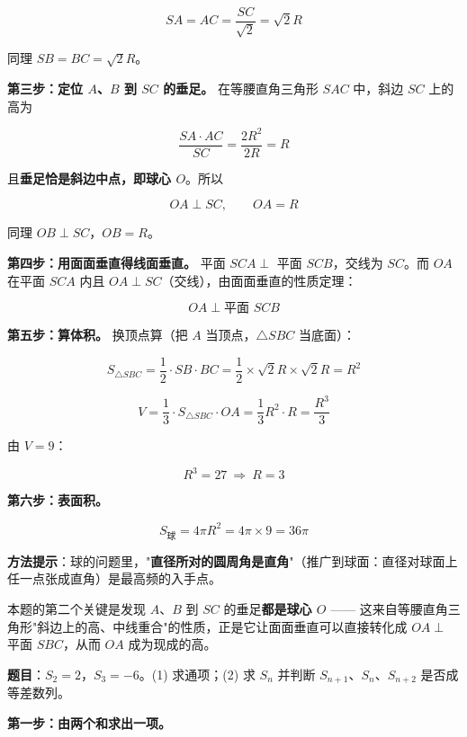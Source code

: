 \[SA=AC=\frac{SC}{\sqrt2}=\sqrt2R\]

同理 $SB=BC=\sqrt2R$。

\textbf{第三步：定位 $A$、$B$ 到 $SC$ 的垂足。} 在等腰直角三角形 $SAC$ 中，斜边 $SC$ 上的高为

\[\frac{SA\cdot AC}{SC}=\frac{2R^{2}}{2R}=R\]

且\textbf{垂足恰是斜边中点，即球心 $O$}。所以

\[OA\perp SC,\qquad OA=R\]

同理 $OB\perp SC$，$OB=R$。

\textbf{第四步：用面面垂直得线面垂直。} 平面 $SCA\perp$ 平面 $SCB$，交线为 $SC$。而 $OA$ 在平面 $SCA$ 内且 $OA\perp SC$（交线），由面面垂直的性质定理：

\[OA\perp\text{平面 }SCB\]

\textbf{第五步：算体积。} 换顶点算（把 $A$ 当顶点，$\triangle SBC$ 当底面）：

\[S_{\triangle SBC}=\frac12\cdot SB\cdot BC=\frac12\times\sqrt2R\times\sqrt2R=R^{2}\]

\[V=\frac13\cdot S_{\triangle SBC}\cdot OA=\frac13R^{2}\cdot R=\frac{R^{3}}3\]

由 $V=9$：

\[R^{3}=27\ \Longrightarrow\ R=3\]

\textbf{第六步：表面积。}

\[S_{\text{球}}=4\pi R^{2}=4\pi\times9=36\pi\]


\begin{gktip}
\textbf{方法提示}：球的问题里，"\textbf{直径所对的圆周角是直角}"（推广到球面：直径对球面上任一点张成直角）是最高频的入手点。

本题的第二个关键是发现 $A$、$B$ 到 $SC$ 的垂足\textbf{都是球心 $O$} —— 这来自等腰直角三角形"斜边上的高、中线重合"的性质，正是它让面面垂直可以直接转化成 $OA\perp$ 平面 $SBC$，从而 $OA$ 成为现成的高。
\end{gktip}

\par\medskip



\textbf{题目}：$S_2=2$，$S_3=-6$。(1) 求通项；(2) 求 $S_n$ 并判断 $S_{n+1}$、$S_n$、$S_{n+2}$ 是否成等差数列。


\textbf{第一步：由两个和求出一项。}

